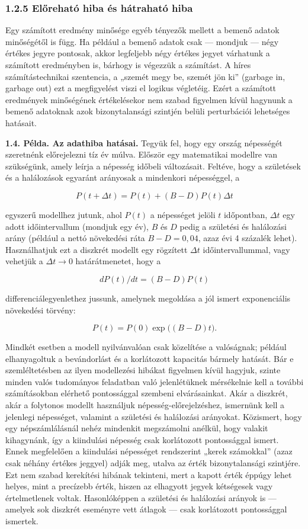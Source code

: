 \documentclass[
  magyar,
  11pt]{article}
\begin{document}
\subsubsection{1.2.5 Előreható hiba és hátraható
hiba}\label{elux151rehatuxf3-hiba-uxe9s-huxe1trahatuxf3-hiba}

Egy számított eredmény minősége egyéb tényezők mellett a bemenő adatok
minőségétől is függ. Ha például a bemenő adatok csak --- mondjuk ---
négy értékes jegyre pontosak, akkor legfeljebb négy értékes jegyet
várhatunk a számított eredményben is, bárhogy is végezzük a számítást. A
híres számítástechnikai szentencia, a „szemét megy be, szemét jön ki''
(garbage in, garbage out) ezt a megfigyelést viszi el logikus végletéig.
Ezért a számított eredmények minőségének értékelésekor nem szabad
figyelmen kívül hagynunk a bemenő adatoknak azok bizonytalansági
szintjén belüli perturbációi lehetséges hatásait.

\textbf{1.4. Példa. Az adathiba hatásai.} Tegyük fel, hogy egy ország
népességét szeretnénk előrejelezni tíz év múlva. Először egy matematikai
modellre van szükségünk, amely leírja a népesség időbeli változásait.
Feltéve, hogy a születések és a halálozások egyaránt arányosak a
mindenkori népességgel, a

\[P(t + \Delta t) = P(t) + (B - D)P(t)\Delta t\]

egyszerű modellhez jutunk, ahol \(P(t)\) a népességet jelöli \(t\)
időpontban, \(\Delta t\) egy adott időintervallum (mondjuk egy év),
\(B\) és \(D\) pedig a születési és halálozási arány (például a nettó
növekedési ráta \(B - D = 0{,}04\), azaz évi 4 százalék lehet).
Használhatjuk ezt a diszkrét modellt egy rögzített \(\Delta t\)
időintervallummal, vagy vehetjük a \(\Delta t \to 0\) határátmenetet,
hogy a

\[dP(t)/dt = (B - D)P(t)\]

differenciálegyenlethez jussunk, amelynek megoldása a jól ismert
exponenciális növekedési törvény:

\[P(t) = P(0) \exp\bigl((B - D)t\bigr).\]

Mindkét esetben a modell nyilvánvalóan csak közelítése a valóságnak;
például elhanyagoltuk a bevándorlást és a korlátozott kapacitás bármely
hatását. Bár e szemléltetésben az ilyen modellezési hibákat figyelmen
kívül hagyjuk, szinte minden valós tudományos feladatban való
jelenlétüknek mérsékelnie kell a további számításokban elérhető
pontossággal szembeni elvárásainkat. Akár a diszkrét, akár a folytonos
modellt használjuk népesség-előrejelzéshez, ismernünk kell a jelenlegi
népességet, valamint a születési és halálozási arányokat. Közismert,
hogy egy népszámlálásnál nehéz mindenkit megszámolni anélkül, hogy
valakit kihagynánk, így a kiindulási népesség csak korlátozott
pontossággal ismert. Ennek megfelelően a kiindulási népességet
rendszerint „kerek számokkal'' (azaz csak néhány értékes jeggyel) adják
meg, utalva az érték bizonytalansági szintjére. Ezt nem szabad
kerekítési hibának tekinteni, mert a kapott érték éppúgy lehet helyes,
mint a precízebb érték, hiszen az elhagyott jegyek kétségesek vagy
értelmetlenek voltak. Hasonlóképpen a születési és halálozási arányok is
--- amelyek sok diszkrét eseményre vett átlagok --- csak korlátozott
pontossággal ismertek.
\end{document}
